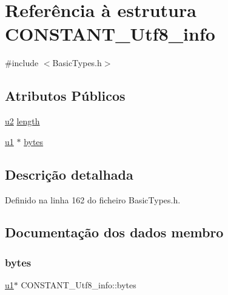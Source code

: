 \hypertarget{structCONSTANT__Utf8__info}{}\section{Referência à estrutura C\+O\+N\+S\+T\+A\+N\+T\+\_\+\+Utf8\+\_\+info}
\label{structCONSTANT__Utf8__info}


{\ttfamily \#include $<$Basic\+Types.\+h$>$}

\subsection*{Atributos Públicos}
\begin{DoxyCompactItemize}
\item 
\hyperlink{BasicTypes_8h_a732cde1300aafb73b0ea6c2558a7a54f}{u2} \hyperlink{structCONSTANT__Utf8__info_a712975144ad624052a94f4a2ebdb954e}{length}
\item 
\hyperlink{BasicTypes_8h_ad9f4cdb6757615aae2fad89dab3c5470}{u1} $\ast$ \hyperlink{structCONSTANT__Utf8__info_a249f598c4ef4c5fd570377fe14672c38}{bytes}
\end{DoxyCompactItemize}


\subsection{Descrição detalhada}


Definido na linha 162 do ficheiro Basic\+Types.\+h.



\subsection{Documentação dos dados membro}
\mbox{\label{structCONSTANT__Utf8__info_a249f598c4ef4c5fd570377fe14672c38}} 
\subsubsection{\texorpdfstring{bytes}{bytes}}
{\footnotesize\ttfamily \hyperlink{BasicTypes_8h_ad9f4cdb6757615aae2fad89dab3c5470}{u1}$\ast$ C\+O\+N\+S\+T\+A\+N\+T\+\_\+\+Utf8\+\_\+info\+::bytes}




